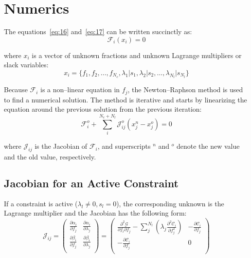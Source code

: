 \documentclass{article}
\begin{document}
\section{Numerics}
\label{sec:numerics}

\noindent The equations~\eqref{eq:16} and~\eqref{eq:17} can be written
succinctly as:
\begin{equation}
\label{eq:18}
    \mathcal{F}_i(x_i) = 0
\end{equation}

\noindent where $x_i$ is a vector of unknown fractions and unknown Lagrange
multipliers or slack variables:
\begin{equation}
\label{eq:19}
    x_i
  =
    \{ f_1, f_2, \ldots, f_{N_c}, \lambda_1 | s_1, \lambda_2 | s_2,
    \ldots, \lambda_{N_l} | s_{N_l} \}
\end{equation}

\indent Because $\mathcal{F}_i$ is a non--linear equation in $f_j$,
the Newton--Raphson method is used to find a numerical solution. The method is
iterative and starts by linearizing the equation around the previous solution
from the previous iteration:
\begin{equation}
\label{eq:20}
    \mathcal{F}_i^o + \sum_{i}^{N_c + N_l} \mathcal{J}_{ij}^o (x_j^n - x_j^o) = 0
\end{equation}

\noindent where $\mathcal{J}_{ij}$ is the Jacobian of $\mathcal{F}_i$, and
superscripts $^n$ and $^o$ denote the new value and the old value, respectively.

\subsection{Jacobian for an Active Constraint}
\label{sec:jacobianActive}

\noindent If a constraint is active ($\lambda_l \ne 0, s_l = 0$), the
corresponding unknown is the Lagrange multiplier and the Jacobian has the
following form:
\begin{equation}
\label{eq:21}
    \mathcal{J}_{ij}
  =
    \begin{pmatrix}
        \frac{\partial \alpha_i}{\partial f_j}
      & \frac{\partial \alpha_i}{\partial \lambda_j} \\
        \frac{\partial \beta_i}{\partial f_j}
      & \frac{\partial \beta_i}{\partial \lambda_j} \\
    \end{pmatrix}
  =
    \begin{pmatrix}
        \frac{\partial^2 \mathcal{G}}{\partial f_i \partial f_j}
      - \sum_j^{N_l} \left( \lambda_j \frac{\partial^2 \mathcal{C}_i}{\partial f_j^2} \right)
      & -\frac{\partial \mathcal{C}_i}{\partial f_j} \\
        -\frac{\partial \mathcal{C}_i}{\partial f_j}
      & 0 \\
    \end{pmatrix}
\end{equation}
\end{document}
